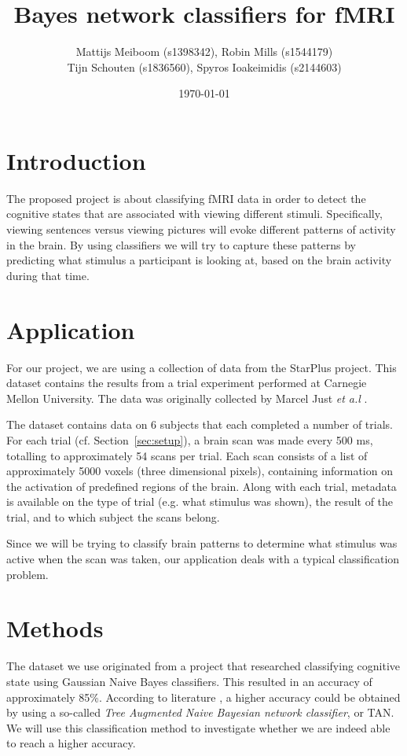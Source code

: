 \documentclass[a4paper, 11pt]{scrartcl}
\title{\Large Bayes network classifiers for fMRI}
\author{\small Mattijs Meiboom (s1398342), Robin Mills (s1544179)\\
			\small Tijn Schouten (s1836560), Spyros Ioakeimidis (s2144603)}
\date{\small \today}
\begin{document}
\maketitle

\thispagestyle{empty}

\section{Introduction}

The proposed project is about classifying fMRI data in order to detect the cognitive states that are associated with viewing different stimuli. Specifically, viewing sentences versus viewing pictures will evoke different patterns of activity in the brain. By using classifiers we will try to capture these patterns by predicting what stimulus a participant is looking at, based on the brain activity during that time.

\section{Application}
\label{sec:application}

For our project, we are using a collection of data from the StarPlus project. This dataset contains the results from a trial experiment performed at Carnegie Mellon University. The data was originally collected by Marcel Just \textit{et a.l} \cite{StarPlus:2004kx}.

The dataset contains data on 6 subjects that each completed a number of trials. For each trial (cf. Section~\ref{sec:setup}), a brain scan was made every 500 ms, totalling to approximately 54 scans per trial. Each scan consists of a list of approximately 5000 voxels (three dimensional pixels), containing information on the activation of predefined regions of the brain. Along with each trial, metadata is available on the type of trial (e.g. what stimulus was shown), the result of the trial, and to which subject the scans belong.

Since we will be trying to classify brain patterns to determine what stimulus was active when the scan was taken, our application deals with a typical classification problem.

\section{Methods}
\label{sec:methods}

The dataset we use originated from a project that researched classifying cognitive state using Gaussian Naive Bayes classifiers. This resulted in an accuracy of approximately 85\%. According to literature \cite{Friedman:1997gw}, a higher accuracy could be obtained by using a so-called \textit{Tree Augmented Naive Bayesian network classifier}, or TAN. We will use this classification method to investigate whether we are indeed able to reach a higher accuracy.
\end{document}
